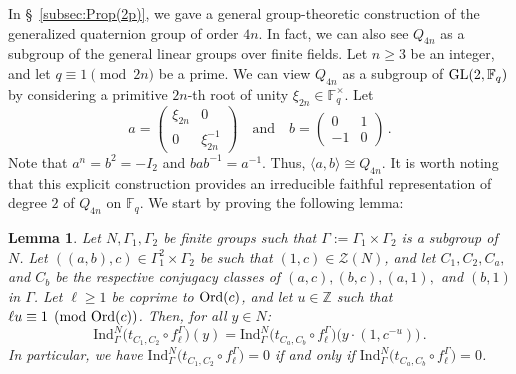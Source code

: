 \documentclass[12pt]{amsart}
\numberwithin{equation}{section}
\newcommand{\Ord}{{\rm Ord}}
\newcommand{\GL}{{\rm GL}}
\newcommand{\F}{\mathbb F}
\newcommand{\Z}{\mathbb Z}
\newtheorem{lem}[X]{Lemma}
\theoremstyle{definition}
\theoremstyle{remark}
\begin{document}
In \S~\ref{subsec:Prop(2p)}, we gave a general group-theoretic construction of the generalized quaternion group of order $4n$. In fact, we can also see $Q_{4n}$ as a subgroup of the general linear groups over finite fields. Let $n\ge 3$ be an integer, and let $q\equiv 1 \pmod{2n}$ be a prime. We can view $Q_{4n}$ as a subgroup of $\GL(2, \F_q)$ by considering a primitive $2n$-th root of unity $\xi_{2n}\in \F_q^\times$. Let 
\[ a=\begin{pmatrix}\xi_{2n}&0\\0&\xi_{2n}^{-1}\end{pmatrix}\quad\text{and}\quad b=\begin{pmatrix}0&1\\-1&0\end{pmatrix}\, . \]
Note that $a^n=b^2=-I_2$ and $bab^{-1}=a^{-1}$. Thus, $\langle a,b\rangle\cong Q_{4n}$. It is worth noting that this explicit construction provides an irreducible faithful representation of degree $2$ of $Q_{4n}$ on $\F_q$. We start by proving the following lemma: 
\begin{lem}\label{reducedinduction}
    Let $N,\Gamma_1,\Gamma_2$ be finite groups such that $\Gamma:=\Gamma_1\times \Gamma_2$ is a subgroup of $N$. Let $((a,b),c)\in \Gamma_1^2\times \Gamma_2$ be such that $(1,c)\in \mathcal{Z}(N)$, and let $C_1,C_2,C_a,$ and $C_b$ be the respective conjugacy classes of $(a,c),(b,c),(a,1),$ and $(b,1)$ in $\Gamma$. Let $\ell\ge 1$ be coprime to $\Ord(c)$, and let $u\in\Z$ such that $\ell u\equiv 1\pmod{\Ord(c)}$. Then, for all $y\in N$:
    \[ \mathrm{Ind}_\Gamma^N \bigl(t_{C_1,C_2}\circ f_\ell^\Gamma\bigr) (y)=\mathrm{Ind}_\Gamma^N \bigl(t_{C_a,C_b}\circ f_\ell^\Gamma\bigr) \bigl(y\cdot(1,c^{-u})\bigr)\, .\]
    In particular, we have $\mathrm{Ind}_\Gamma^N \bigl(t_{C_1,C_2}\circ f_\ell^\Gamma\bigr)=0$ if and only if $\mathrm{Ind}_\Gamma^N \bigl(t_{C_a,C_b}\circ f_\ell^\Gamma\bigr)=0$.
\end{lem}
\end{document}
